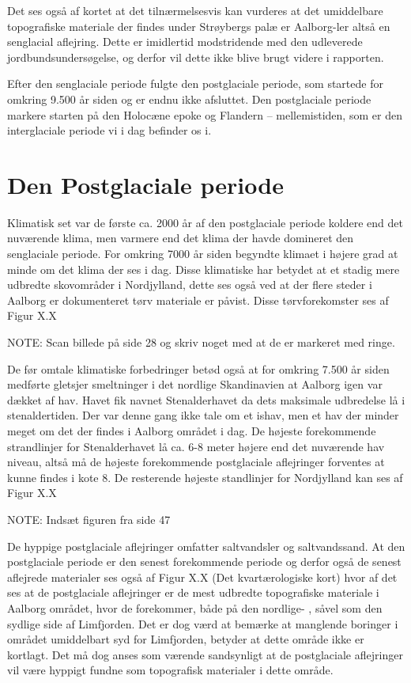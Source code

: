 Det ses også af kortet at det tilnærmelsesvis kan vurderes at det umiddelbare topografiske materiale der findes under Strøybergs palæ er Aalborg-ler altså en senglacial aflejring. Dette er imidlertid modstridende med den udleverede jordbundsundersøgelse, og derfor vil dette ikke blive brugt videre i rapporten. 

Efter den senglaciale periode fulgte den postglaciale periode, som startede for omkring 9.500 år siden og er endnu ikke afsluttet. Den postglaciale periode markere starten på den Holocæne epoke og Flandern – mellemistiden, som er den interglaciale periode vi i dag befinder os i. 

\section{Den Postglaciale periode}

Klimatisk set var de første ca. 2000 år af den postglaciale periode koldere end det nuværende klima, men varmere end det klima der havde domineret den senglaciale periode. For omkring 7000 år siden begyndte klimaet i højere grad at minde om det klima der ses i dag. Disse klimatiske har betydet at et stadig mere udbredte skovområder i Nordjylland, dette ses også ved at der flere steder i Aalborg er dokumenteret tørv materiale er påvist. Disse tørvforekomster ses af Figur X.X

NOTE: Scan billede på side 28 og skriv noget med at de er markeret med ringe.

De før omtale klimatiske forbedringer betød også at for omkring 7.500 år siden medførte gletsjer smeltninger i det nordlige Skandinavien at Aalborg igen var dækket af hav. Havet fik navnet Stenalderhavet da dets maksimale udbredelse lå i stenaldertiden. Der var denne gang ikke tale om et ishav, men et hav der minder meget om det der findes i Aalborg området i dag. De højeste forekommende strandlinjer for Stenalderhavet lå ca. 6-8 meter højere end det nuværende hav niveau, altså må de højeste forekommende postglaciale aflejringer forventes at kunne findes i kote 8. De resterende højeste standlinjer for Nordjylland kan ses af Figur X.X  

NOTE: Indsæt figuren fra side 47

De hyppige postglaciale aflejringer omfatter saltvandsler og saltvandssand. At den postglaciale periode er den senest forekommende periode og derfor også de senest aflejrede materialer ses også af Figur X.X (Det kvartærologiske kort) hvor af det ses at de postglaciale aflejringer er de mest udbredte topografiske materiale i Aalborg området, hvor de forekommer, både på den nordlige- , såvel som den sydlige side af Limfjorden. Det er dog værd at bemærke at manglende boringer i området umiddelbart syd for Limfjorden, betyder at dette område ikke er kortlagt. Det må dog anses som værende sandsynligt at de postglaciale aflejringer vil være hyppigt fundne som topografisk materialer i dette område. 

